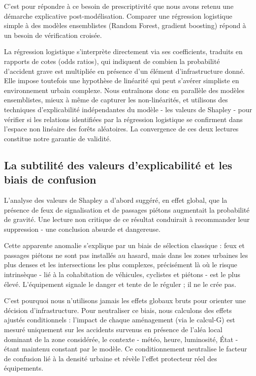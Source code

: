 \documentclass[12pt, a4paper]{article}
\begin{document}
C'est pour répondre à ce besoin de prescriptivité que nous avons retenu une démarche explicative post-modélisation. Comparer une régression logistique simple à des modèles ensemblistes (Random Forest, gradient boosting) répond à un besoin de vérification croisée.

La régression logistique s'interprète directement via ses coefficients, traduits en rapports de cotes (odds ratios), qui indiquent de combien la probabilité d'accident grave est multipliée en présence d'un élément d'infrastructure donné. Elle impose toutefois une hypothèse de linéarité qui peut s'avérer simpliste en environnement urbain complexe. Nous entraînons donc en parallèle des modèles ensemblistes, mieux à même de capturer les non-linéarités, et utilisons des techniques d'explicabilité indépendantes du modèle - les valeurs de Shapley - pour vérifier si les relations identifiées par la régression logistique se confirment dans l'espace non linéaire des forêts aléatoires. La convergence de ces deux lectures constitue notre garantie de validité.

\subsection{La subtilité des valeurs d'explicabilité et les biais de confusion}

L'analyse des valeurs de Shapley a d'abord suggéré, en effet global, que la présence de feux de signalisation et de passages piétons augmentait la probabilité de gravité. Une lecture non critique de ce résultat conduirait à recommander leur suppression - une conclusion absurde et dangereuse.

Cette apparente anomalie s'explique par un biais de sélection classique : feux et passages piétons ne sont pas installés au hasard, mais dans les zones urbaines les plus denses et les intersections les plus complexes, précisément là où le risque intrinsèque - lié à la cohabitation de véhicules, cyclistes et piétons - est le plus élevé. L'équipement signale le danger et tente de le réguler ; il ne le crée pas.

C'est pourquoi nous n'utilisons jamais les effets globaux bruts pour orienter une décision d'infrastructure. Pour neutraliser ce biais, nous calculons des effets ajustés conditionnels : l'impact de chaque aménagement (via le calcul-G) est mesuré uniquement sur les accidents survenus en présence de l'aléa local dominant de la zone considérée, le contexte - météo, heure, luminosité, État - étant maintenu constant par le modèle. Ce conditionnement neutralise le facteur de confusion lié à la densité urbaine et révèle l'effet protecteur réel des équipements.
\end{document}
